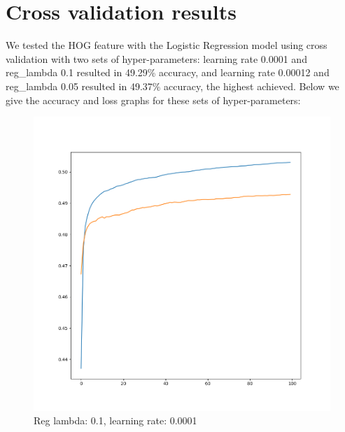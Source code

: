 \documentclass[11pt]{article}
\begin{document}
\section*{Cross validation results}
We tested the HOG feature with the Logistic Regression model using cross validation with two sets of hyper-parameters: learning rate 0.0001 and reg\_lambda 0.1 resulted in 49.29\% accuracy, and learning rate 0.00012 and reg\_lambda 0.05 resulted in 49.37\% accuracy, the highest achieved.
Below we give the accuracy and loss graphs for these sets of hyper-parameters:
\begin{figure}[h]
	\begin{minipage}{0.5 \textwidth}
		\centering
		\includegraphics[width=1 \textwidth]{figure/HOG_Log_Acc_Reg-0.1_CV.png}
		\caption{Reg lambda: 0.1, learning rate: 0.0001}
		\label{fig:HOG_Log_Acc_Reg-0.1_CV}
	\end{minipage}
	\begin{minipage}{0.5 \textwidth}
		\centering

\end{minipage}
\end{figure}
\end{document}
